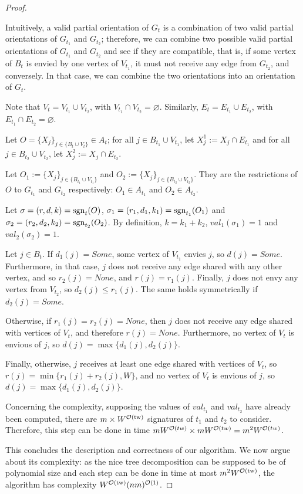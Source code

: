 \begin{proof}
\begin{lemma}
    \end{lemma}
    Intuitively, a valid partial orientation of $G_t$ is a combination of two valid partial orientations of $G_{t_1}$ and $G_{t_2}$; therefore, we can combine two possible valid partial orientations of $G_{t_1}$ and $G_{t_2}$ and see if they are compatible, that is, if some vertex of $B_t$ is envied by one vertex of $V_{t_1}$, it must not receive any edge from $G_{t_2}$, and conversely. In that case, we can combine the two orientations into an orientation of $G_t$.

    \begin{nestedproof}
        Note that $V_t=V_{t_1}\cup V_{t_2}$, with $V_{t_1}\cap V_{t_2}=\varnothing$. Similarly, $E_t=E_{t_1}\cup E_{t_2}$, with $E_{t_1}\cap E_{t_2}=\varnothing$.

    Let $O=\{X_j\}_{j\in\{B_t\cup V_t\}}\in A_t$; for all $j\in B_{t_1}\cup V_{t_1}$, let $X_j^1:=X_j\cap E_{t_1}$ and
    for all $j\in B_{t_2}\cup V_{t_2}$, let $X_j^2:=X_j\cap E_{t_2}$.

    Let $O_1:=\{X_j\}_{j\in\{B_{t_1}\cup V_{t_1}\}} $ and $O_2:=\{X_j\}_{j\in\{B_{t_2}\cup V_{t_2}\}}$. They are the restrictions of $O$ to $G_{t_1}$ and $G_{t_2}$ respectively: $O_1\in A_{t_1}$ and $O_2\in A_{t_2}$.

    Let $\sigma=(r,d,k)=\operatorname{sgn}_t(O)$, $\sigma_1=(r_1,d_1,k_1)=\operatorname{sgn}_{t_1}(O_1)$ and $\sigma_2=(r_2,d_2,k_2)=\operatorname{sgn}_{t_2}(O_2)$. By definition, $k=k_1+k_2$, $val_1(\sigma_1)=1$ and $val_2(\sigma_2)=1$.

    Let $j\in B_t$. If $d_1(j)=Some$, some vertex of $V_{t_1}$ envies $j$, so $d(j)=Some$. Furthermore, in that case, $j$ does not receive any edge shared with any other vertex, and so $r_2(j)=None$, and $r(j)=r_1(j)$. Finally, $j$ does not envy any vertex from $V_{t_2}$, so $d_2(j)\leq r_1(j)$. The same holds symmetrically if $d_2(j)=Some$.

    Otherwise, if $r_1(j)=r_2(j)=None$, then $j$ does not receive any edge shared with vertices of $V_t$, and therefore $r(j)=None$. Furthermore, no vertex of $V_t$ is envious of $j$, so $d(j)=\max\{d_1(j),d_2(j)\}$.

    Finally, otherwise, $j$ receives at least one edge shared with vertices of $V_t$, so $r(j)=\min\{r_1(j)+r_2(j),W\}$, and no vertex of $V_t$ is envious of $j$, so $d(j)=\max\{d_1(j),d_2(j)\}$.
    \end{nestedproof}

    Concerning the complexity, supposing the values of $val_{t_1}$ and $val_{t_2}$ have already been computed, there are $m\times W^{\mathcal{O}(\mathrm{tw})}$ signatures of $t_1$ and $t_2$ to consider. Therefore, this step can be done in time $mW^{\mathcal{O}(tw)}\times mW^{\mathcal{O}(tw)}=m^2W^{\mathcal{O}(tw)}$.
    \medskip

    This concludes the description and correctness of our algorithm. We now argue about its complexity: as the nice tree decomposition can be supposed to be of polynomial size and each step can be done in time at most $m^2W^{\mathcal{O}(\mathrm{tw})}$, the algorithm has complexity $W^{\mathcal{O}(\mathrm{tw})}(nm)^{\mathcal{O}(1)}$.
\end{proof}

